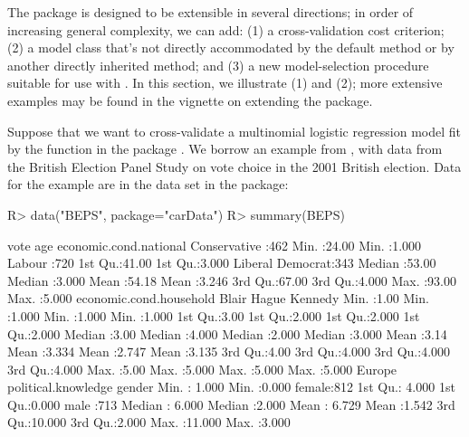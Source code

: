 \documentclass[
]{jss}
\begin{document}
The  package is designed to be extensible in several directions;
in order of increasing general complexity, we can add: (1) a
cross-validation cost criterion; (2) a model class that's not directly
accommodated by the  default method or by another directly
inherited method; and (3) a new model-selection procedure suitable for
use with . In this section, we illustrate (1) and
(2); more extensive examples may be found in the vignette on extending
the  package.

Suppose that we want to cross-validate a multinomial logistic regression
model fit by the  function in the  package
\citep{VenablesRipley:2002}. We borrow an example from \citet[Sec.
14.2.1]{Fox:2016}, with data from the British Election Panel Study on
vote choice in the 2001 British election. Data for the example are in
the  data set in the  package:

\begin{CodeChunk}
\begin{CodeInput}
R> data("BEPS", package="carData")
R> summary(BEPS)
\end{CodeInput}
\begin{CodeOutput}
               vote          age        economic.cond.national
 Conservative    :462   Min.   :24.00   Min.   :1.000         
 Labour          :720   1st Qu.:41.00   1st Qu.:3.000         
 Liberal Democrat:343   Median :53.00   Median :3.000         
                        Mean   :54.18   Mean   :3.246         
                        3rd Qu.:67.00   3rd Qu.:4.000         
                        Max.   :93.00   Max.   :5.000         
 economic.cond.household     Blair           Hague          Kennedy     
 Min.   :1.00            Min.   :1.000   Min.   :1.000   Min.   :1.000  
 1st Qu.:3.00            1st Qu.:2.000   1st Qu.:2.000   1st Qu.:2.000  
 Median :3.00            Median :4.000   Median :2.000   Median :3.000  
 Mean   :3.14            Mean   :3.334   Mean   :2.747   Mean   :3.135  
 3rd Qu.:4.00            3rd Qu.:4.000   3rd Qu.:4.000   3rd Qu.:4.000  
 Max.   :5.00            Max.   :5.000   Max.   :5.000   Max.   :5.000  
     Europe       political.knowledge    gender   
 Min.   : 1.000   Min.   :0.000       female:812  
 1st Qu.: 4.000   1st Qu.:0.000       male  :713  
 Median : 6.000   Median :2.000                   
 Mean   : 6.729   Mean   :1.542                   
 3rd Qu.:10.000   3rd Qu.:2.000                   
 Max.   :11.000   Max.   :3.000                   
\end{CodeOutput}
\end{CodeChunk}
\end{document}
